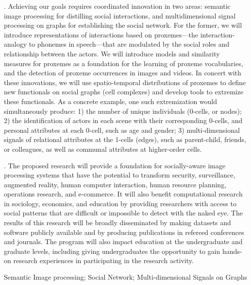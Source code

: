 . Achieving our goals requires coordinated innovation in two areas: semantic image processing for distilling social interactions, and multidimensional signal processing on graphs for establishing the social network.  For the former, we will introduce representations of interactions  based on proxemes---the interaction-analogy to phonemes in speech---that are modulated by the social roles and relationship between the actors. We will introduce models and similarity measures for proxemes as a foundation for the learning of proxeme vocabularies, and the detection of proxeme occurrences in images and videos. In concert with these innovations, we will use spatio-temporal distributions of proxemes to define new functionals on social graphs (cell complexes) and develop tools to extremize these functionals. As a concrete example, one such extremization would simultaneously produce: 1) the number of unique individuals (0-cells, or nodes); 2) the identification of actors in each scene with their corresponding 0-cells, and personal attributes at each 0-cell, such as age and gender; 3) multi-dimensional signals of relational attributes at the 1-cells (edges), such as parent-child, friends, or colleagues, as well as communal attributes at higher-order cells.

. The proposed research will provide a foundation for socially-aware image processing systems that have the potential to transform security, surveillance, augmented reality, human computer interaction, human resource planning, operations research, and e-commerce. It will also benefit computational research in sociology, economics, and education by providing researchers with access to social patterns that are difficult or impossible to detect with the naked eye. The results of this research will be broadly disseminated by making datasets and software publicly available and by producing publications in refereed conferences and journals. The program will also impact education at the undergraduate and graduate levels, including giving undergraduates the opportunity to gain hands-on research experiences in participating in the research activity. 

 Semantic Image processing; Social Network; Multi-dimensional Signals on Graphs


